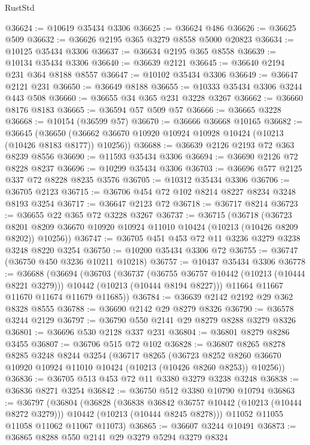 \begin{lexlean}{RustStd}
\begin{coremodule}
{\begin{coremodule}
{{{{{{{{{{{{{{{{{{{{{{{{{{@36624 := @10619 @35434 @3306
@36625 := @36624 @486
@36626 := @36625 @509
@36632 := @36626 @2195 @365 @3279 @8558 @5000 @20823
@36634 := @10125 @35434 @3306
@36637 := @36634 @2195 @365 @8558
@36639 := @10134 @35434 @3306
@36640 := @36639 @2121
@36645 := @36640 @2194 @231 @364 @8188 @8557
@36647 := @10102 @35434 @3306
@36649 := @36647 @2121 @231
@36650 := @36649 @8188
@36655 := @10333 @35434 @3306 @3244 @443 @508
@36660 := @36655 @34 @365 @231 @3228 @3267
@36662 := @36660 @8176 @8183
@36665 := @36594 @57 @509 @57
@36666 := @36665 @3228
@36668 := @10154 (@36599 @57)
@36670 := @36666 @36668 @10165
@36682 := @36645
    (@36650 (@36662 @36670 @10920 @10924 @10928 @10424 (@10213 (@10426 @8183 @8177)) @10256))
@36688 := @36639 @2126 @2193 @72 @363 @8239 @8556
@36690 := @11593 @35434 @3306
@36694 := @36690 @2126 @72 @8228 @8237
@36696 := @10299 @35434 @3306
@36703 := @36696 @577 @2125 @337 @72 @8228 @8235 @3576
@36705 := @10312 @35434 @3306
@36706 := @36705 @2123
@36715 := @36706 @454 @72 @102 @8214 @8227 @8234 @3248 @8193 @3254
@36717 := @36647 @2123 @72
@36718 := @36717 @8214
@36723 := @36655 @22 @365 @72 @3228 @3267
@36737 := @36715
    (@36718
      (@36723 @8201 @8209 @36670 @10920 @10924 @11010 @10424 (@10213 (@10426 @8209 @8202)) @10256))
@36747 := @36705 @451 @453 @72 @11 @3236 @3279 @3238 @3248 @8220 @3254
@36750 := @10200 @35434 @3306 @72
@36755 := @36747 (@36750 @450 @3236 @10211 @10218)
@36757 := @10437 @35434 @3306
@36778 := @36688
    (@36694
      (@36703
        (@36737
          (@36755 @36757 @10442 (@10213 (@10444 @8221 @3279)))
          @10442
          (@10213 (@10444 @8194 @8227)))
        @11664
        @11667
        @11670
        @11674
        @11679
        @11685))
@36784 := @36639 @2142 @2192 @29 @362 @8328 @8555
@36788 := @36690 @2142 @29 @8279 @8326
@36790 := @36578 @3244 @2129
@36797 := @36790 @550 @2141 @29 @8279 @8288 @3279 @8326
@36801 := @36696 @530 @2128 @337 @231
@36804 := @36801 @8279 @8286 @3455
@36807 := @36706 @515 @72 @102
@36828 := @36807
    @8265
    @8278
    @8285
    @3248
    @8244
    @3254
    (@36717
      @8265
      (@36723 @8252 @8260 @36670 @10920 @10924 @11010 @10424 (@10213 (@10426 @8260 @8253)) @10256))
@36836 := @36705 @513 @453 @72 @11 @3380 @3279 @3238 @3248
@36838 := @36836 @8271 @3254
@36842 := @36750 @512 @3380 @10790 @10794
@36863 := @36797
    (@36804
      (@36828
        (@36838 @36842 @36757 @10442 (@10213 (@10444 @8272 @3279)))
        @10442
        (@10213 (@10444 @8245 @8278)))
      @11052
      @11055
      @11058
      @11062
      @11067
      @11073)
@36865 := @36607 @3244 @10491
@36873 := @36865 @8288 @550 @2141 @29 @3279 @5294 @3279 @8324
}}}}}}}}}}}}}}}}}}}}}}}}}}
\end{coremodule}}
\end{coremodule}
\end{lexlean}
